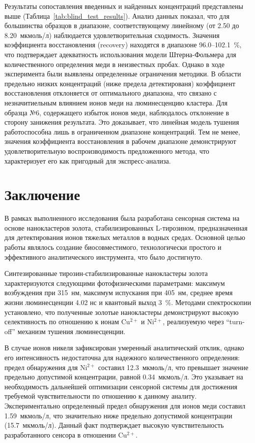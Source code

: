 \documentclass[a4paper, 12pt]{article}
\begin{document}
\begin{onehalfspace}
	Результаты сопоставления введенных и найденных концентраций представлены выше (Таблица~\ref{tab:blind_test_results}).
	Анализ данных показал, что для большинства образцов в диапазоне, соответствующему линейному (от 2.50 до 8.20~мкмоль/л) наблюдается удовлетворительная сходимость.
	Значения коэффициента восстановления (recovery) находятся в диапазоне 96.0–102.1~\%, что подтверждает адекватность использования модели Штерна-Фольмера для количественного определения меди в неизвестных пробах.
	Однако в ходе эксперимента были выявлены определенные ограничения методики.
	В области предельно низких концентраций (ниже предела детектированя) коэффициент восстановления отклоняется от оптимального диапазона, что связано с незначитиельным влиянием ионов меди на люминесценцию кластера.
	Для образца №6, содержащего избыток ионов меди, наблюдалось отклонение в сторону занижения результата.
	Это доказывает, что линейная модель тушения работоспособна лишь в ограниченном диапазоне концентраций.
	Тем не менее, значения коэффициента восстановления в рабочем диапазоне демонстрируют удовлетворительную воспроизводимость предложенного метода, что характеризует его как пригодный для экспресс-анализа.

\newpage
\section*{Заключение}

В рамках выполненного исследования была разработана сенсорная система на основе нанокластеров золота, стабилизированных L-тирозином, предназначенная для детектирования ионов тяжелых металлов в водных средах. Основной целью работы являлось создание биосовместимого, технологически простого и эффективного аналитического инструмента, что было достигнуто.

Синтезированные тирозин-стабилизированные нанокластеры золота характеризуются следующими фотофизическими параметрами: максимум возбуждения при 315~нм, максимум испускания при 405~нм, среднее время жизни люминесценции 4.02 нс и квантовый выход 3~\%. Методами спектроскопии установлено, что полученные золотые нанокластеры демонстрируют высокую селективность по отношению к ионам Cu$^{2+}$ и Ni$^{2+}$, реализуемую через \enquote{turn-off} механизм тушения люминесценции.

В случае ионов никеля зафиксирован умеренный аналитический отклик, однако его интенсивность недостаточна для надежного количественного определения: пре\-дел об\-на\-ру\-же\-ния для Ni$^{2+}$ сос\-та\-вил 12.3~мкмоль/л, что превышает зна\-че\-ние пре\-дель\-но до\-пус\-ти\-мой кон\-цен\-тра\-ции, равной 0.34~мкмоль/л. Это указывает на необходимость дальнейшей оптимизации сенсорной системы для достижения требуемой чувствительности по отношению к данному аналиту.
Экспериментально определенный предел обнаружения для ионов меди сос\-та\-вил 1.59~мкмоль/л, что значительно ниже предельно допустимой концентрации (15.7~мкмоль/л). Данный факт подтверждает высокую чувствительность разработанного сенсора в отношении Cu$^{2+}$.


\end{onehalfspace}
\end{document}

